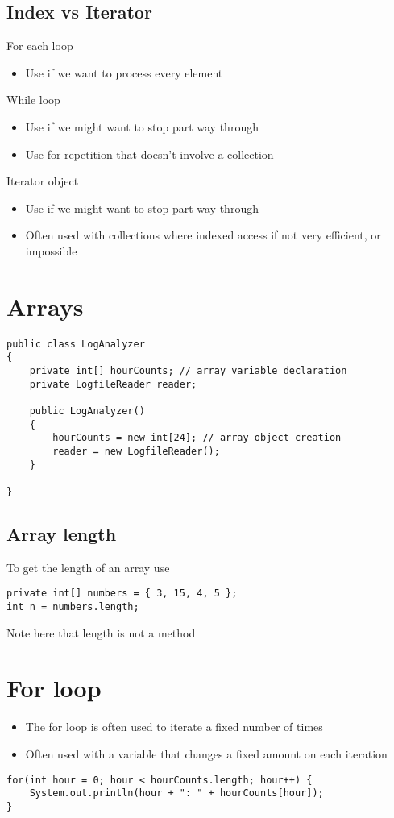 \documentclass{article}[18pt]
\begin{document}
\subsection{Index vs Iterator}
For each loop
\begin{itemize}
	\item Use if we want to process every element
\end{itemize}
While loop
\begin{itemize}
	\item Use if we might want to stop part way through
	\item Use for repetition that doesn't involve a collection
\end{itemize}
Iterator object
\begin{itemize}
	\item Use if we might want to stop part way through
	\item Often used with collections where indexed access if not very efficient, or impossible
\end{itemize}
\section{Arrays}
\begin{verbatim}
public class LogAnalyzer
{
	private int[] hourCounts; // array variable declaration
	private LogfileReader reader;
	
	public LogAnalyzer()
	{ 
		hourCounts = new int[24]; // array object creation
		reader = new LogfileReader();
	}

}
\end{verbatim}
\subsection{Array length}
To get the length of an array use
\begin{verbatim}
private int[] numbers = { 3, 15, 4, 5 };
int n = numbers.length;
\end{verbatim}
Note here that length is not a method
\section{For loop}
\begin{itemize}
	\item The for loop is often used to iterate a fixed number of times
	\item Often used with a variable that changes a fixed amount on each iteration
\end{itemize}
\begin{verbatim}
for(int hour = 0; hour < hourCounts.length; hour++) {
	System.out.println(hour + ": " + hourCounts[hour]);
}
\end{verbatim}
\end{document}
